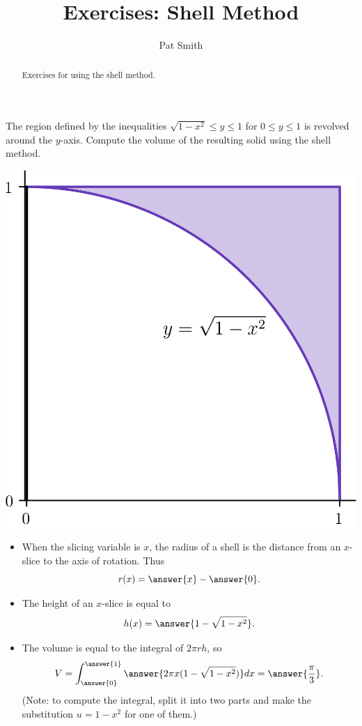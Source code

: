 \documentclass{ximera}
\title{Exercises: Shell Method}
\author{Pat Smith}
\begin{document}
\begin{abstract}
Exercises for using the shell method.
\end{abstract}
\maketitle

\begin{exercise}
The region defined by the inequalities $\sqrt{1-x^2} \leq y \leq 1$ for $0 \leq y \leq 1$ is revolved around the $y$-axis. Compute the volume of the resulting solid using the shell method.
\begin{center}
\begin{image}
\includegraphics{shell/shell03.png}
\end{image}
\end{center}
\begin{itemize}
\item When the slicing variable is $x$, the radius of a shell is the  distance from an $x$-slice to the axis of rotation. Thus
\[ r(x) = \answer{x} - \answer{0}. \]
\item The height of an $x$-slice is equal to
\[ h(x) = \answer{1 - \sqrt{1 - x^2}}. \]
\item The volume is equal to the integral of $2 \pi r h$, so 
\[ V = \int_{\answer{0}}^{\answer{1}} \answer{2 \pi x ( 1 - \sqrt{1-x^2}) } dx = \answer{\frac{\pi}{3}}. \]
(Note: to compute the integral, split it into two parts and make the substitution $u = 1-x^2$ for one of them.)
\end{itemize}
\end{exercise}
\end{document}
